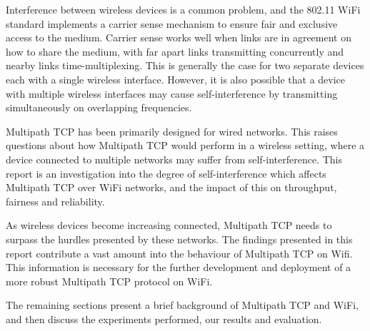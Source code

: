 Interference between wireless devices is a common problem, and the 802.11 WiFi
standard implements a carrier sense mechanism to ensure fair and exclusive
access to the medium. Carrier sense works well when links are in agreement on 
how to share the medium, with far apart links transmitting concurrently and 
nearby links time-multiplexing. This is generally the case for two separate 
devices each with a single wireless interface. However, it is also possible that 
a device with multiple wireless interfaces may cause self-interference by
transmitting simultaneously on overlapping frequencies.

Multipath TCP has been primarily designed for wired networks. This raises
questions about how Multipath TCP would perform in a wireless setting, where a
device connected to multiple networks may suffer from self-interference. This
report is an investigation into the degree of self-interference which affects
Multipath TCP over WiFi networks, and the impact of this on throughput,
fairness and reliability.

As wireless devices become increasing connected, Multipath 
TCP needs to surpass the hurdles presented by these networks. The findings 
presented in this report contribute a vast amount into the behaviour of
Multipath TCP on Wifi. This information is necessary for the further
development and  deployment of a more robust Multipath TCP protocol on WiFi.

The remaining sections present a brief background of Multipath TCP and WiFi, and
then discuss the experiments performed, our results and evaluation.

